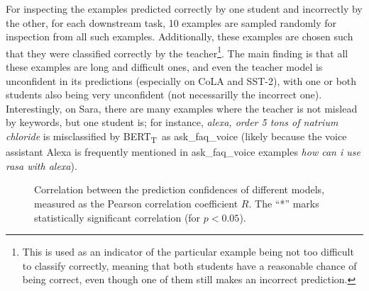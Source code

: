 \documentclass[bsc,frontabs,twoside,singlespacing,parskip,deptreport]{infthesis}
\def\BERTT{BERT\textsubscript{T}}
\begin{document}
{{{      For inspecting the examples predicted correctly by one student and incorrectly by the other, for each downstream task, 10 examples are sampled randomly for inspection from all such examples.
      Additionally, these examples are chosen such that they were classified correctly by the teacher\footnote{This is used as an indicator of the particular example being not too difficult to classify correctly, meaning that both students have a reasonable chance of being correct, even though one of them still makes an incorrect prediction.}.
      The main finding is that all these examples are long and difficult ones, and even the teacher model is unconfident in its predictions (especially on CoLA and SST-2), with one or both students also being very unconfident (not necessarilly the incorrect one). Interestingly, on Sara, there are many examples where the teacher is not mislead by keywords, but one student is; for instance, \textit{alexa, order 5 tons of natrium chloride} is misclassified by \BERTT~as ask\_faq\_voice (likely because the voice assistant Alexa is frequently mentioned in ask\_faq\_voice examples \textit{how can i use rasa with alexa}).
      
      \begin{figure}[h!tb]
        \centering
        \caption{Correlation between the prediction confidences of different models, measured as the Pearson correlation coefficient $R$. The ``*'' marks statistically significant correlation (for $p < 0.05$).}
        \label{fig:confidence-correlation}
      \end{figure}

}}}
\end{document}
